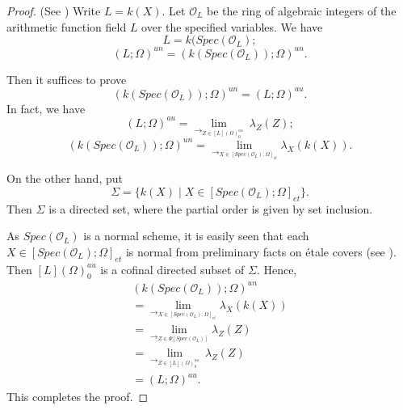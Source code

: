 \documentclass{amsart}
\theoremstyle{definition}
\numberwithin{equation}{section}
\begin{document}
\begin{proof}
(See \cite{an2,an4})
Write $L=k(X)$. Let $\mathcal{O}_{L}$ be the ring  of algebraic integers of the arithmetic function field $L$ over the specified variables. We have
\begin{equation*}
L=k(Spec(\mathcal{O}_{L});
\end{equation*}
\begin{equation*}
(L;\Omega)^{un}=(k(Spec(\mathcal{O}_{L}));\Omega)^{un}.
\end{equation*}

Then it suffices to prove
\begin{equation*}
(k(Spec(\mathcal{O}_{L}));\Omega)^{un}=(L;\Omega)^{au}.
\end{equation*}
In fact, we have
\begin{equation*}
(L;\Omega)^{au}= {{\lim}_{\rightarrow_{Z\in {\left[ L \right](\Omega)^{au}_{0}}}}}{\ \lambda_{Z}(Z)};
\end{equation*}
\begin{equation*}
(k(Spec(\mathcal{O}_{L}));\Omega)^{un}= {{\lim}_{\rightarrow_{X\in {\left[Spec(\mathcal{O}_{L}); \Omega \right]_{et}}}}}{\lambda_{X}(k(X))}.
\end{equation*}

On the other hand, put
\begin{equation*}
\Sigma=\{k(X)\mid X\in {\left[Spec(\mathcal{O}_{L});
\Omega \right]_{et}}\}.
\end{equation*}
Then $\Sigma$ is a directed set, where the partial order is given by set inclusion.

As $Spec(\mathcal{O}_{L})$ is a normal scheme, it is easily seen that each $X\in {\left[Spec(\mathcal{O}_{L}); \Omega \right]_{et}}$ is normal from
preliminary facts on \'{e}tale covers (see \cite{sga1,mln}). Then $\left[ L \right](\Omega)^{au}_{0}$ is a cofinal directed subset of $\Sigma$.
Hence,
\begin{equation*}
\begin{array}{l}
(k(Spec(\mathcal{O}_{L}));\Omega)^{un} \\
={{\lim}_{\rightarrow_{X\in {\left[Spec(\mathcal{O}_{L}); \Omega \right]_{et}}}}}{\lambda_{X}(k(X))} \\
= {{\lim}_{\rightarrow_{Z\in {\Psi[Spec(\mathcal{O}_{L})]}}}}{\lambda_{Z}(Z)}
\\
={{\lim}_{\rightarrow_{Z\in {\left[ L \right](\Omega)^{au}_{0}}}}}{\
\lambda_{Z}(Z)} \\
=(L;\Omega)^{au}.\end{array}\end{equation*}
This completes the proof.
\end{proof}
\end{document}
